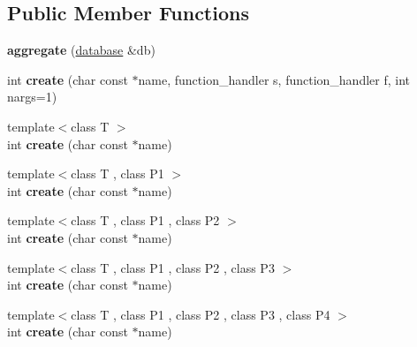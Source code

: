 \subsection*{Public Member Functions}
\begin{DoxyCompactItemize}
\item 
\hypertarget{classsqlite3pp_1_1ext_1_1aggregate_ad71d74c08c6d53328bab6bf1da0e625c}{{\bfseries aggregate} (\hyperlink{classsqlite3pp_1_1database}{database} \&db)}\label{classsqlite3pp_1_1ext_1_1aggregate_ad71d74c08c6d53328bab6bf1da0e625c}

\item 
\hypertarget{classsqlite3pp_1_1ext_1_1aggregate_a1274bb5675300d3f1d21155c6a259eea}{int {\bfseries create} (char const $\ast$name, function\-\_\-handler s, function\-\_\-handler f, int nargs=1)}\label{classsqlite3pp_1_1ext_1_1aggregate_a1274bb5675300d3f1d21155c6a259eea}

\item 
\hypertarget{classsqlite3pp_1_1ext_1_1aggregate_ab6b95557659b1cfeedf55a35558ef34c}{{\footnotesize template$<$class T $>$ }\\int {\bfseries create} (char const $\ast$name)}\label{classsqlite3pp_1_1ext_1_1aggregate_ab6b95557659b1cfeedf55a35558ef34c}

\item 
\hypertarget{classsqlite3pp_1_1ext_1_1aggregate_a2028d43621d1a5309a9218119f58ea09}{{\footnotesize template$<$class T , class P1 $>$ }\\int {\bfseries create} (char const $\ast$name)}\label{classsqlite3pp_1_1ext_1_1aggregate_a2028d43621d1a5309a9218119f58ea09}

\item 
\hypertarget{classsqlite3pp_1_1ext_1_1aggregate_a003fb5df884159eb6b39d6ae95212315}{{\footnotesize template$<$class T , class P1 , class P2 $>$ }\\int {\bfseries create} (char const $\ast$name)}\label{classsqlite3pp_1_1ext_1_1aggregate_a003fb5df884159eb6b39d6ae95212315}

\item 
\hypertarget{classsqlite3pp_1_1ext_1_1aggregate_af8160d679aa3aa7c78a1a4b15cb6832b}{{\footnotesize template$<$class T , class P1 , class P2 , class P3 $>$ }\\int {\bfseries create} (char const $\ast$name)}\label{classsqlite3pp_1_1ext_1_1aggregate_af8160d679aa3aa7c78a1a4b15cb6832b}

\item 
\hypertarget{classsqlite3pp_1_1ext_1_1aggregate_a70550b4815fd77a0d9a15f2738666376}{{\footnotesize template$<$class T , class P1 , class P2 , class P3 , class P4 $>$ }\\int {\bfseries create} (char const $\ast$name)}\label{classsqlite3pp_1_1ext_1_1aggregate_a70550b4815fd77a0d9a15f2738666376}


\end{DoxyCompactItemize}
